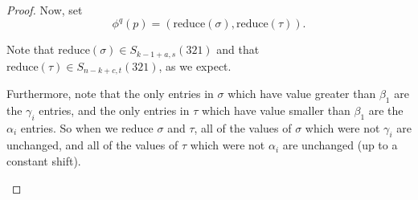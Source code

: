 \documentclass[11pt]{amsart}
\theoremstyle{remark}
\numberwithin{equation}{section}
\begin{document}
\begin{proof}
    Now, set
    \[
    \phi^q(p) = (\text{reduce}(\sigma), \text{reduce}(\tau)).
    \]

    Note that $\text{reduce}(\sigma)\in S_{k - 1 + a,s}(321)$ and that $\text{reduce}(\tau) \in S_{n-k + c,t}(321)$, as we expect.
    
    \vspace{10pt}
    Furthermore, note that the only entries in $\sigma$ which have value greater than $\beta_1$ are the $\gamma_i$ entries, and the only entries in $\tau$ which have value smaller than $\beta_1$ are the $\alpha_i$ entries. So when we reduce $\sigma$ and $\tau$, all of the values of $\sigma$ which were not $\gamma_i$ are unchanged, and all of the values of $\tau$ which were not $\alpha_i$ are unchanged (up to a constant shift).

    \begin{figure}[H]
        \centering
    

\end{figure}
\end{proof}
\end{document}
